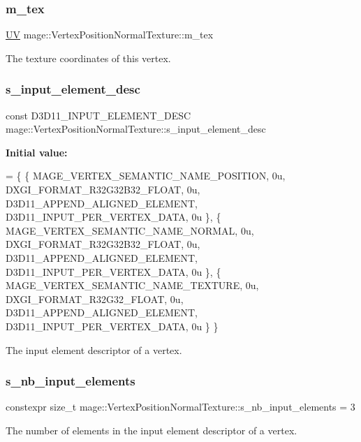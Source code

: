 \subsubsection{\texorpdfstring{m\+\_\+tex}{m\_tex}}
{\footnotesize\ttfamily \hyperlink{structmage_1_1_u_v}{UV} mage\+::\+Vertex\+Position\+Normal\+Texture\+::m\+\_\+tex}

The texture coordinates of this vertex. \hypertarget{structmage_1_1_vertex_position_normal_texture_a52500b6efc9c9e1a4c81eb86673770cf}{}\label{structmage_1_1_vertex_position_normal_texture_a52500b6efc9c9e1a4c81eb86673770cf} 
\subsubsection{\texorpdfstring{s\+\_\+input\+\_\+element\+\_\+desc}{s\_input\_element\_desc}}
{\footnotesize\ttfamily const D3\+D11\+\_\+\+I\+N\+P\+U\+T\+\_\+\+E\+L\+E\+M\+E\+N\+T\+\_\+\+D\+E\+SC mage\+::\+Vertex\+Position\+Normal\+Texture\+::s\+\_\+input\+\_\+element\+\_\+desc\hspace{0.3cm}{\ttfamily [static]}}

{\bfseries Initial value\+:}
\begin{DoxyCode}
= \{
        \{ MAGE\_VERTEX\_SEMANTIC\_NAME\_POSITION, 0u, DXGI\_FORMAT\_R32G32B32\_FLOAT,    0u, 
      D3D11\_APPEND\_ALIGNED\_ELEMENT, D3D11\_INPUT\_PER\_VERTEX\_DATA, 0u \},
        \{ MAGE\_VERTEX\_SEMANTIC\_NAME\_NORMAL,   0u, DXGI\_FORMAT\_R32G32B32\_FLOAT,    0u, 
      D3D11\_APPEND\_ALIGNED\_ELEMENT, D3D11\_INPUT\_PER\_VERTEX\_DATA, 0u \},
        \{ MAGE\_VERTEX\_SEMANTIC\_NAME\_TEXTURE,  0u, DXGI\_FORMAT\_R32G32\_FLOAT,       0u, 
      D3D11\_APPEND\_ALIGNED\_ELEMENT, D3D11\_INPUT\_PER\_VERTEX\_DATA, 0u \}
    \}
\end{DoxyCode}
The input element descriptor of a vertex. \hypertarget{structmage_1_1_vertex_position_normal_texture_a0bde36712236569de4bca8308fd7a284}{}\label{structmage_1_1_vertex_position_normal_texture_a0bde36712236569de4bca8308fd7a284} 
\subsubsection{\texorpdfstring{s\+\_\+nb\+\_\+input\+\_\+elements}{s\_nb\_input\_elements}}
{\footnotesize\ttfamily constexpr size\+\_\+t mage\+::\+Vertex\+Position\+Normal\+Texture\+::s\+\_\+nb\+\_\+input\+\_\+elements = 3\hspace{0.3cm}{\ttfamily [static]}}

The number of elements in the input element descriptor of a vertex. 